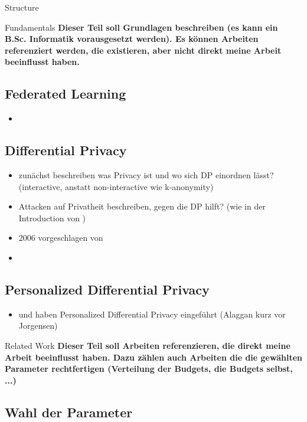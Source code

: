 \begin{chapter}{Structure}
	\begin{section}{Fundamentals}
		\textbf{Dieser Teil soll Grundlagen beschreiben (es kann ein B.Sc. Informatik vorausgesetzt werden). Es können Arbeiten referenziert werden, die existieren, aber nicht direkt meine Arbeit beeinflusst haben.}
		
		\subsection{Federated Learning}
		\begin{itemize}
			\item 
		\end{itemize}
		
		\subsection{Differential Privacy}
		\begin{itemize}
			\item zunächst beschreiben was Privacy ist und wo sich DP einordnen lässt? (interactive, anstatt non-interactive wie k-anonymity)
			\item Attacken auf Privatheit beschreiben, gegen die DP hilft? (wie in der Introduction von \cite{abadi:2016})
			\item 2006 vorgeschlagen von \cite{dwork:2006}
			\item 
		\end{itemize}
		
		\subsection{Personalized Differential Privacy}
		\begin{itemize}
			\item \cite{alaggan:2016} und \cite{jorgensen:2015} haben Personalized Differential Privacy eingeführt (Alaggan kurz vor Jorgensen)
		\end{itemize}
		
	\end{section}
	
	\begin{section}{Related Work}
		\textbf{Dieser Teil soll Arbeiten referenzieren, die direkt meine Arbeit beeinflusst haben. Dazu zählen auch Arbeiten die die gewählten Parameter rechtfertigen (Verteilung der Budgets, die Budgets selbst, ...)}
		
		\subsection{Wahl der Parameter}

\end{section}
\end{chapter}
